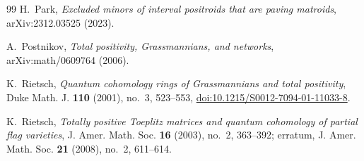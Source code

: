 \documentclass[11pt]{amsart}
\theoremstyle{definition}
\theoremstyle{remark}
\begin{document}
\begin{thebibliography}{99}
H.~Park,
\emph{Excluded minors of interval positroids that are paving matroids},
arXiv:2312.03525 (2023).

A.~Postnikov,
\emph{Total positivity, Grassmannians, and networks},
arXiv:math/0609764 (2006).

K.~Rietsch,
\emph{Quantum cohomology rings of Grassmannians and total positivity},
Duke Math. J. \textbf{110} (2001), no.~3, 523--553,
\href{https://doi.org/10.1215/S0012-7094-01-11033-8}{doi:10.1215/S0012-7094-01-11033-8}.

K.~Rietsch,
\emph{Totally positive Toeplitz matrices and quantum cohomology of partial flag varieties},
J. Amer. Math. Soc. \textbf{16} (2003), no.~2, 363--392;
erratum, J. Amer. Math. Soc. \textbf{21} (2008), no.~2, 611--614.

\end{thebibliography}
\end{document}
